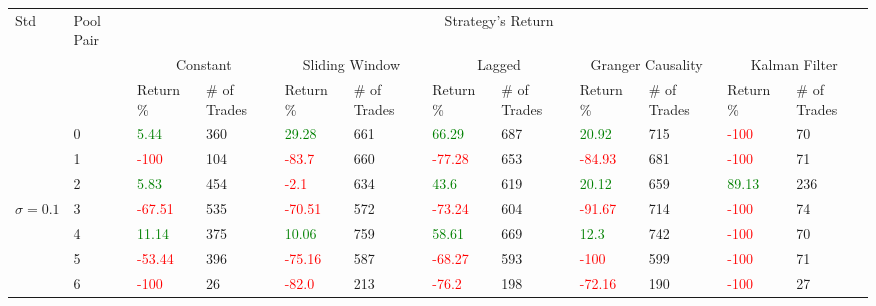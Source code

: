 \begin{table}[!htb]
    \centering
    \begin{adjustwidth}{-0.8in}{-0.9in}
        \begin{tabular}{|p{4em}|p{2em}|p{3em}|p{3em}|p{3em}|p{3em}|p{3em}|p{3em}|p{3em}|p{3em}|p{3em}|p{3em}|}\hline
            Std & Pool Pair & \multicolumn{10}{|c|}{Strategy's Return} \\\cline{3-12}
            &   & \multicolumn{2}{|c|}{Constant} & \multicolumn{2}{|c|}{Sliding Window} & \multicolumn{2}{|c|}{Lagged} & \multicolumn{2}{|c|}{Granger Causality} & \multicolumn{2}{|c|}{Kalman Filter}\\\cline{3-12}
            & & Return \% & \# of Trades & Return \% & \# of Trades & Return \% & \# of Trades & Return \% & \# of Trades & Return \% & \# of Trades\\\hline
            
            & 0 & \textcolor{green}{5.44} & 360 & \textcolor{green}{29.28} & 661 & \textcolor{green}{66.29} & 687 & \textcolor{green}{20.92} & 715 & \textcolor{red}{-100} & 70\\\cline{3-12}
            & 1 & \textcolor{red}{-100} & 104 & \textcolor{red}{-83.7} & 660 & \textcolor{red}{-77.28} & 653 & \textcolor{red}{-84.93} & 681 & \textcolor{red}{-100} & 71\\\cline{3-12}
            & 2 & \textcolor{green}{5.83} & 454 & \textcolor{red}{-2.1} & 634 & \textcolor{green}{43.6} & 619 & \textcolor{green}{20.12} & 659 & \textcolor{green}{89.13} & 236\\\cline{3-12}
            $\sigma=0.1$& 3 & \textcolor{red}{-67.51} & 535 & \textcolor{red}{-70.51} & 572 & \textcolor{red}{-73.24} & 604 & \textcolor{red}{-91.67} & 714 & \textcolor{red}{-100} & 74\\\cline{3-12}
            & 4 & \textcolor{green}{11.14} & 375 & \textcolor{green}{10.06} & 759 & \textcolor{green}{58.61} & 669 & \textcolor{green}{12.3} & 742 & \textcolor{red}{-100} & 70\\\cline{3-12}
            & 5 & \textcolor{red}{-53.44} & 396 & \textcolor{red}{-75.16} & 587 & \textcolor{red}{-68.27} & 593 & \textcolor{red}{-100} & 599 & \textcolor{red}{-100} & 71\\\cline{3-12}
            & 6 & \textcolor{red}{-100} & 26 & \textcolor{red}{-82.0} & 213 & \textcolor{red}{-76.2} & 198 & \textcolor{red}{-72.16} & 190 & \textcolor{red}{-100} & 27\\\hline\hline
            

\end{tabular}
\end{adjustwidth}
\end{table}
